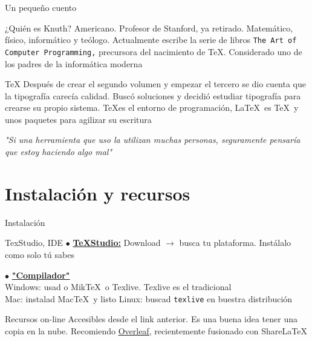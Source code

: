 \documentclass[12pt]{beamer}
\begin{document}
\begin{frame}{Un pequeño cuento}
\small
\begin{block}{¿Quién es Knuth?}
	Americano. Profesor de Stanford, ya retirado. Matemático, físico, informático y teólogo. Actualmente escribe la serie de libros \texttt{The Art of Computer Programming,} precursora del nacimiento de \TeX. Considerado uno de los padres de la informática moderna
\end{block}

\begin{block}{\TeX}
	Después de crear el segundo volumen y empezar el tercero se dio cuenta que la tipografía carecía calidad. Buscó soluciones y decidió estudiar tipografía para crearse su propio sistema. \TeX es el entorno de programación, \LaTeX\ es \TeX\ y unos paquetes para agilizar su escritura
\end{block}

	\textit{"Si una herramienta que uso la utilizan muchas personas, seguramente pensaría que estoy haciendo algo mal"}

\end{frame}

\section{Instalación y recursos}

\begin{frame}{Instalación}

\begin{block}{TexStudio, IDE}
	$\bullet$ \href{http://www.texstudio.org/}{\textbf{\TeX Studio:}} Download $\rightarrow$ busca tu plataforma. Instálalo como solo tú sabes
\end{block}

\begin{block}{\LaTeXe}
	$\bullet$ \href{https://www.latex-project.org/get/}{\textbf{"Compilador"}} \\
	Windows: usad o Mik\TeX\ o Texlive. Texlive es el tradicional\\
	Mac: instalad Mac\TeX\ y listo
	Linux: buscad \texttt{texlive} en buestra distribución
\end{block}
\begin{block}{Recursos on-line}
	Accesibles desde el link anterior. Es una buena idea tener una copia en la nube. Recomiendo \href{https://www.overleaf.com/}{Overleaf,} recientemente fusionado con Share\LaTeX
\end{block}
\end{frame}
\end{document}
